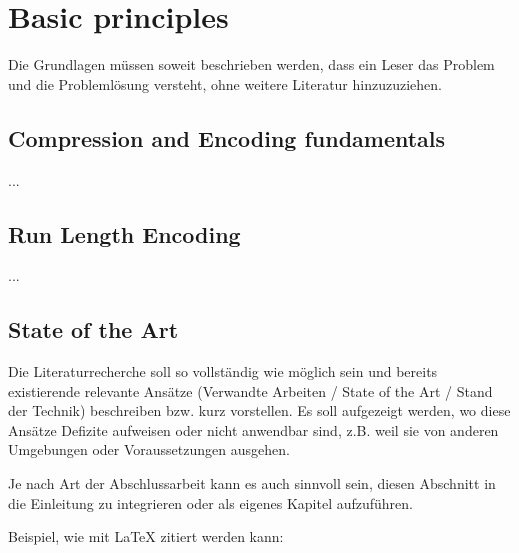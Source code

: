 
\chapter{Basic principles}
\label{ch:Basic principles}
Die Grundlagen müssen soweit beschrieben
werden, dass ein Leser das Problem und
die Problemlösung versteht, ohne weitere Literatur hinzuzuziehen.


\section{Compression and Encoding fundamentals}
\label{ch:Grundlagen:sec:Abschnitt1}

...

\section{Run Length Encoding}
\label{ch:Grundlagen:sec:Abschnitt2}

...

\section{State of the Art}
\label{ch:Grundlagen:sec:SOTA}
Die Literaturrecherche soll so vollständig wie möglich sein und bereits existierende relevante Ansätze (Verwandte Arbeiten / State of the Art / Stand der Technik) beschreiben bzw. kurz vorstellen.
Es soll aufgezeigt werden, wo diese Ansätze Defizite aufweisen oder nicht anwendbar sind, z.B. weil sie von anderen Umgebungen oder Voraussetzungen ausgehen.

Je nach Art der Abschlussarbeit kann es auch sinnvoll sein, diesen Abschnitt in die Einleitung zu integrieren oder als eigenes Kapitel aufzuführen.

Beispiel, wie mit LaTeX zitiert werden kann: \cite{TB98,JSAC96,qosr}


